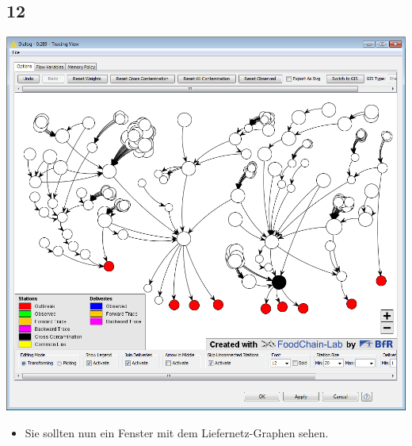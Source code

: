 \documentclass{beamer}
\begin{document}
\subsection{12}
\begin{frame}
	\begin{center}
  		\includegraphics[height=0.6\textheight]{12.png}
	\end{center}
	\begin{itemize}
		\item Sie sollten nun ein Fenster mit dem Liefernetz-Graphen sehen.
	\end{itemize}
\end{frame}
\end{document}
